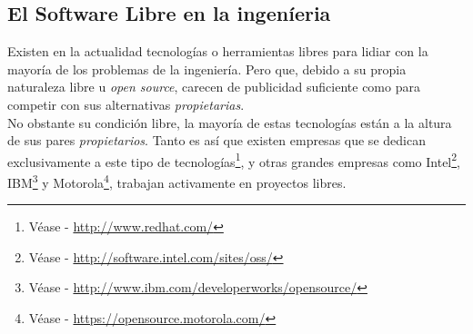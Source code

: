 \subsection{El Software Libre en la ingen\'ieria} 
Existen en la actualidad tecnolog\'ias o herramientas libres para lidiar con la
mayor\'ia de los problemas de la ingenier\'ia. Pero que, debido a su propia
naturaleza libre u \emph{open source}, carecen de publicidad suficiente como
para competir con sus alternativas \emph{propietarias}. \\

No obstante su condici\'on libre, la mayor\'ia de estas tecnolog\'ias est\'an a
la
altura de sus pares \emph{propietarios}. Tanto es as\'i que existen empresas
que
se dedican exclusivamente a este tipo de tecnolog\'ias\footnote{V\'ease -
\url{http://www.redhat.com/}}, y otras grandes empresas como
Intel\footnote{V\'ease - \url{http://software.intel.com/sites/oss/}},
IBM\footnote{V\'ease - \url{http://www.ibm.com/developerworks/opensource/}} y
Motorola\footnote{V\'ease - \url{https://opensource.motorola.com/}}, trabajan
activamente en proyectos libres.\\
